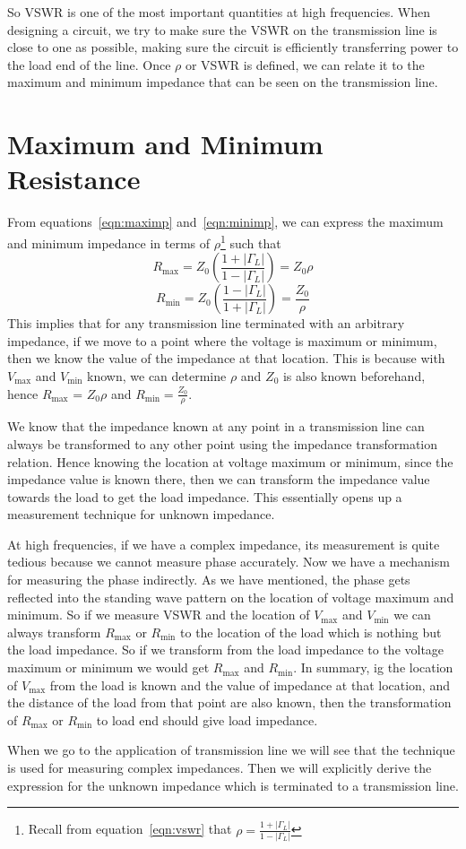 So VSWR is one of the most important quantities at high frequencies. When designing a circuit, we try to make sure the VSWR on the transmission line is close to one as possible, making sure the circuit is efficiently transferring power to the load end of the line. Once $\rho$ or VSWR is defined, we can relate it to the maximum and minimum impedance that can be seen on the transmission line.

\section{Maximum and Minimum Resistance}
From equations~\eqref{eqn:maximp} and~\eqref{eqn:minimp}, we can express the maximum and minimum impedance in terms of $\rho$\footnote{
Recall from equation~\eqref{eqn:vswr} that $\rho = \frac{1 + |\Gamma_L|}{1 - |\Gamma_L|}$
} such that
\begin{dmath}
R_{\max} = Z_0 \left(\frac{1 + |\Gamma_L|}{1 - |\Gamma_L|}\right)
= Z_0\rho
\label{eqn:maximprho}
\end{dmath}
\begin{dmath}
R_{\min} = Z_0 \left(\frac{1 - |\Gamma_L|}{1 + |\Gamma_L|}\right) 
=\frac{Z_0}{\rho}
\label{eqn:minimprho}
\end{dmath}
This implies that for any transmission line terminated with an arbitrary impedance, if we move to a point where the voltage is maximum or minimum, then we know the value of the impedance at that location. This is because with $V_{\max}$ and $V_{\min}$ known, we can determine $\rho$ and $Z_0$ is also known beforehand, hence $R_{\max}$ = $Z_0 \rho$ and $R_{\min} = \frac{Z_0}{\rho}$.

We know that the impedance known at any point in a transmission line can always be transformed to any other point using the impedance transformation relation. Hence knowing the location at voltage maximum or minimum, since the impedance value is known there, then we can transform the impedance value towards the load to get the load impedance. This essentially opens up a measurement technique for unknown impedance.

At high frequencies, if we have a complex impedance, its measurement is quite tedious because we cannot measure phase accurately. Now we have a mechanism for measuring the phase indirectly. As we have mentioned, the phase gets reflected into the standing wave pattern on the location of voltage maximum and minimum. So if we measure VSWR and the location of $V_{\max}$ and $V_{\min}$ we can always transform $R_{\max}$ or $R_{\min}$ to the location of the load which is nothing but the load impedance. So if we transform from the load impedance to the voltage maximum or minimum we would get $R_{\max}$ and $R_{\min}$. In summary, ig the location of $V_{\max}$ from the load is known and the value of impedance at that location, and the distance of the load from that point are also known, then the transformation of $R_{\max}$ or $R_{\min}$ to load end should give load impedance.

When we go to the application of transmission line we will see that the technique is used for measuring complex impedances. Then we will explicitly derive the expression for the unknown impedance which is terminated to a transmission line. 